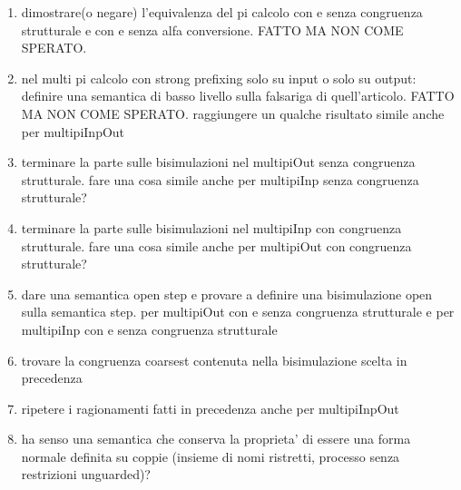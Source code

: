 




\begin{enumerate}
  \item
    dimostrare(o negare) l'equivalenza del pi calcolo con e senza congruenza strutturale e con e senza alfa conversione. FATTO MA NON COME SPERATO.
  \item
    nel multi pi calcolo con strong prefixing solo su input o solo su output: definire una semantica di basso livello sulla falsariga di quell'articolo. FATTO MA NON COME SPERATO.
    raggiungere un qualche risultato simile anche per multipiInpOut
  \item
    terminare la parte sulle bisimulazioni nel multipiOut senza congruenza strutturale.
    fare una cosa simile anche per multipiInp senza congruenza strutturale?
  \item
    terminare la parte sulle bisimulazioni nel multipiInp con congruenza strutturale.
    fare una cosa simile anche per multipiOut con congruenza strutturale?
  \item
    dare una semantica open step e provare a definire una bisimulazione open sulla semantica step.
    per multipiOut con e senza congruenza strutturale e per multipiInp con e senza congruenza strutturale
  \item
    trovare la congruenza coarsest contenuta nella bisimulazione scelta in precedenza
  \item
    ripetere i ragionamenti fatti in precedenza anche per multipiInpOut
  \item
    ha senso una semantica che conserva la proprieta' di essere una forma normale definita su coppie (insieme di nomi ristretti, processo senza restrizioni unguarded)?
\end{enumerate}


